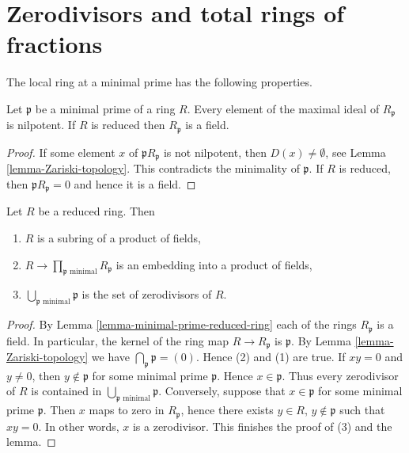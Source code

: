 \section{Zerodivisors and total rings of fractions}
\label{section-total-quotient-ring}

\noindent
The local ring at a minimal prime has the following properties.

\begin{lemma}
\label{lemma-minimal-prime-reduced-ring}
Let $\mathfrak p$ be a minimal prime of a ring $R$.
Every element of the maximal ideal of $R_{\mathfrak p}$
is nilpotent. If $R$ is reduced then $R_{\mathfrak p}$
is a field.
\end{lemma}

\begin{proof}
If some element $x$ of ${\mathfrak p}R_{\mathfrak p}$
is not nilpotent, then $D(x) \not = \emptyset$, see
Lemma \ref{lemma-Zariski-topology}. This contradicts
the minimality of $\mathfrak p$. If $R$ is reduced,
then ${\mathfrak p}R_{\mathfrak p} = 0$ and
hence it is a field.
\end{proof}

\begin{lemma}
\label{lemma-reduced-ring-sub-product-fields}
Let $R$ be a reduced ring. Then
\begin{enumerate}
\item $R$ is a subring of a product of fields,
\item $R \to \prod_{\mathfrak p\text{ minimal}} R_{\mathfrak p}$
is an embedding into a product of fields,
\item $\bigcup_{\mathfrak p\text{ minimal}} \mathfrak p$ is the set
of zerodivisors of $R$.
\end{enumerate}
\end{lemma}

\begin{proof}
By Lemma \ref{lemma-minimal-prime-reduced-ring} each of the rings
$R_\mathfrak p$ is a field. In particular, the kernel of the ring
map $R \to R_\mathfrak p$ is $\mathfrak p$.
By Lemma \ref{lemma-Zariski-topology}
we have $\bigcap_{\mathfrak p} \mathfrak p = (0)$.
Hence (2) and (1) are true. If $x y = 0$ and $y \not = 0$, then
$y \not \in \mathfrak p$ for some minimal prime $\mathfrak p$.
Hence $x \in \mathfrak p$. Thus every zerodivisor of $R$ is contained
in $\bigcup_{\mathfrak p\text{ minimal}} \mathfrak p$.
Conversely, suppose that $x \in \mathfrak p$ for some minimal
prime $\mathfrak p$. Then $x$ maps to zero in $R_\mathfrak p$,
hence there exists $y \in R$, $y \not \in \mathfrak p$ such that
$xy = 0$. In other words, $x$ is a zerodivisor. This finishes the
proof of (3) and the lemma.
\end{proof}

